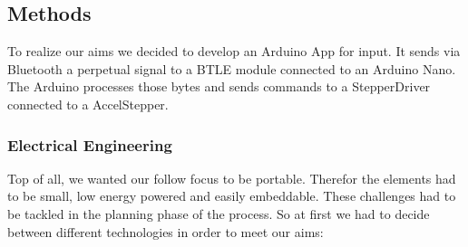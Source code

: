 \documentclass{sigchi}
\begin{document}
\subsection{Methods}
To realize our aims we decided to develop an Arduino App for input. It sends via Bluetooth a perpetual signal to a BTLE module connected to an Arduino Nano. The Arduino processes those bytes and sends commands to a StepperDriver connected to a AccelStepper. 


\subsubsection{Electrical Engineering}
Top of all, we wanted our follow focus to be portable. Therefor the elements had to be small, low energy powered and easily embeddable. These challenges had to be tackled in the planning phase of the process. So at first we had to decide between different technologies in order to meet our aims:
\end{document}
